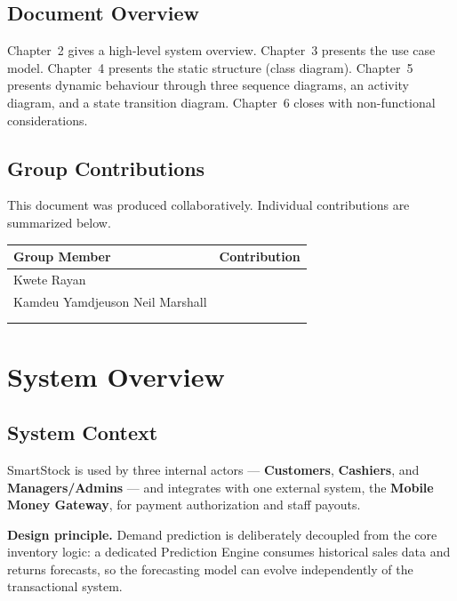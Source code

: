 \documentclass[11pt,a4paper]{report}
\newcommand{\sysname}{SmartStock}
\begin{document}
\section{Document Overview}
Chapter~2 gives a high-level system overview. Chapter~3 presents the use case model. Chapter~4 presents the static structure (class diagram). Chapter~5 presents dynamic behaviour through three sequence diagrams, an activity diagram, and a state transition diagram. Chapter~6 closes with non-functional considerations.

\section{Group Contributions}
This document was produced collaboratively. Individual contributions are summarized below.

\begin{center}
\begin{tabular}{@{}p{4cm}p{10cm}@{}}
\toprule
\textbf{Group Member} & \textbf{Contribution} \\
\midrule
Kwete Rayan & \\[6pt]
Kamdeu Yamdjeuson Neil Marshall & \\[6pt]
 & \\[6pt]
 & \\[6pt]
\bottomrule
\end{tabular}
\end{center}

\chapter{System Overview}

\section{System Context}
\sysname{} is used by three internal actors --- \textbf{Customers}, \textbf{Cashiers}, and \textbf{Managers/Admins} --- and integrates with one external system, the \textbf{Mobile Money Gateway}, for payment authorization and staff payouts.

\begin{infobox}
\textbf{Design principle.} Demand prediction is deliberately decoupled from the core inventory logic: a dedicated Prediction Engine consumes historical sales data and returns forecasts, so the forecasting model can evolve independently of the transactional system.
\end{infobox}
\end{document}
